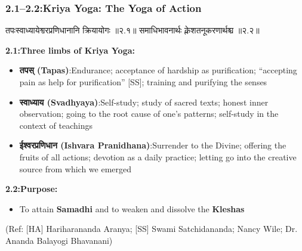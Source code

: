 \begin{frame}[fragile]\frametitle{2.1–2.2:Kriya Yoga: The Yoga of Action}

\begin{sanskrit}
तपःस्वाध्यायेश्वरप्रणिधानानि क्रियायोगः ॥२.१॥
समाधिभावनार्थः क्लेशतनूकरणार्थश्च ॥२.२॥
\end{sanskrit}

\textbf{2.1:Three limbs of Kriya Yoga:}
\begin{itemize}
\item \textbf{तपस् (Tapas)}:Endurance; acceptance of hardship as purification; ``accepting pain as help for purification'' [SS]; training and purifying the senses
\item \textbf{स्वाध्याय (Svadhyaya)}:Self-study; study of sacred texts; honest inner observation; going to the root cause of one's patterns; self-study in the context of teachings
\item \textbf{ईश्वरप्रणिधान (Ishvara Pranidhana)}:Surrender to the Divine; offering the fruits of all actions; devotion as a daily practice; letting go into the creative source from which we emerged
\end{itemize}

\textbf{2.2:Purpose:}
\begin{itemize}
\item To attain \textbf{Samadhi} and to weaken and dissolve the \textbf{Kleshas}
\end{itemize}

\tiny{(Ref: [HA] Hariharananda Aranya; [SS] Swami Satchidananda; Nancy Wile; Dr. Ananda Balayogi Bhavanani)}

\end{frame}


